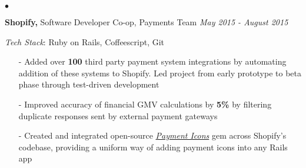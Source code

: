 \documentclass[11pt]{article}
\newenvironment{achievements}{\begin{list}{$\bullet$}{\topsep 0pt \itemsep -1.5pt \leftmargin 5pt}}{\vspace*{4pt}\end{list}}
\begin{document}
\begin{achievements}
\vspace{6pt}

\item \textbf{Shopify,} Software Developer Co-op, Payments Team \hfill \textit {May 2015 - August 2015}

\vspace{2pt}
\item[ ] \textit{Tech Stack}: Ruby on Rails, Coffeescript, Git
\vspace{3pt}

\begin{itemize}
\item[-]Added over \textbf{100} third party payment system integrations by automating addition of these systems to Shopify. Led project from early prototype to beta phase through test-driven development
\vspace{3pt}
\item[-]Improved accuracy of financial GMV calculations by \textbf{5\%} by filtering duplicate responses sent by external payment gateways
\vspace{3pt}
\item[-]Created and integrated open-source \textit{\href{https://rubygems.org/gems/payment_icons}{Payment Icons}} gem across Shopify's codebase, providing a uniform way of adding payment icons into any Rails app
\end{itemize}
\end{achievements}

\vspace{7pt}
\end{document}
